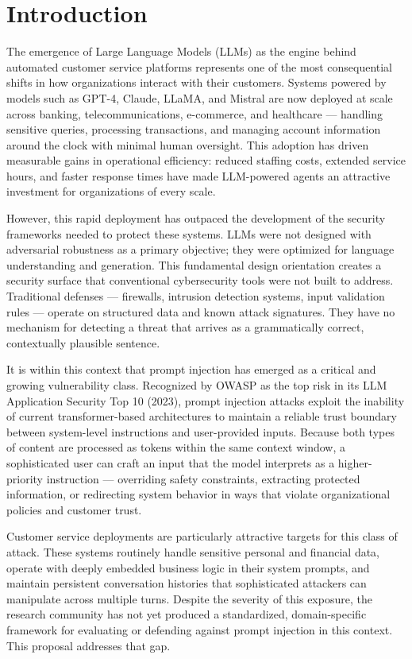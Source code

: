 \documentclass[12pt,a4paper]{article}
\begin{document}
\section{Introduction}

The emergence of Large Language Models (LLMs) as the engine behind automated customer service platforms represents one of the most consequential shifts in how organizations interact with their customers. Systems powered by models such as GPT-4, Claude, LLaMA, and Mistral are now deployed at scale across banking, telecommunications, e-commerce, and healthcare — handling sensitive queries, processing transactions, and managing account information around the clock with minimal human oversight. This adoption has driven measurable gains in operational efficiency: reduced staffing costs, extended service hours, and faster response times have made LLM-powered agents an attractive investment for organizations of every scale.

However, this rapid deployment has outpaced the development of the security frameworks needed to protect these systems. LLMs were not designed with adversarial robustness as a primary objective; they were optimized for language understanding and generation. This fundamental design orientation creates a security surface that conventional cybersecurity tools were not built to address. Traditional defenses — firewalls, intrusion detection systems, input validation rules — operate on structured data and known attack signatures. They have no mechanism for detecting a threat that arrives as a grammatically correct, contextually plausible sentence.

It is within this context that prompt injection has emerged as a critical and growing vulnerability class. Recognized by OWASP as the top risk in its LLM Application Security Top 10 (2023), prompt injection attacks exploit the inability of current transformer-based architectures to maintain a reliable trust boundary between system-level instructions and user-provided inputs. Because both types of content are processed as tokens within the same context window, a sophisticated user can craft an input that the model interprets as a higher-priority instruction — overriding safety constraints, extracting protected information, or redirecting system behavior in ways that violate organizational policies and customer trust.

Customer service deployments are particularly attractive targets for this class of attack. These systems routinely handle sensitive personal and financial data, operate with deeply embedded business logic in their system prompts, and maintain persistent conversation histories that sophisticated attackers can manipulate across multiple turns. Despite the severity of this exposure, the research community has not yet produced a standardized, domain-specific framework for evaluating or defending against prompt injection in this context. This proposal addresses that gap.
\end{document}
